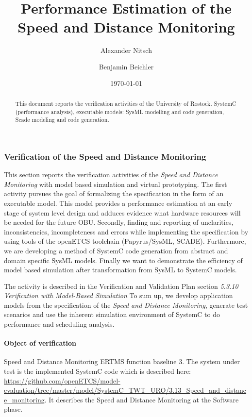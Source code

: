 \documentclass{article}
\title{Performance Estimation of the Speed and Distance Monitoring}
\author{Alexander Nitsch \and Benjamin Beichler}
\date{\today}
\newcommand{\nl}{\mbox{}\\}
\begin{document}
\maketitle
\begin{abstract}
  This document reports the verification activities of the University of Rostock. SystemC (performance analysis), executable models: SysML modelling and code generation, Scade modeling and code generation.
\end{abstract}


\subsubsection{Verification of the  Speed and Distance Monitoring}

This section reports the verification activities of the \emph{Speed and Distance Monitoring} with model based simulation and virtual prototyping. The first activity pursues the goal of formalizing the specification in the form of an executable model. This model provides a performance estimation at an early stage of system level design and adduces evidence what hardware resources will be needed for the future OBU. Secondly, finding and reporting of unclarities, inconsistencies, incompleteness and errors while implementing the specification by using tools of the openETCS toolchain (Papyrus/SysML, SCADE). Furthermore, we are developing a method of SystemC code generation from abstract and domain specific SysML models. Finally we want to demonstrate the efficiency of model based simulation after transformation from SysML to SystemC models.

The activity is described in the Verification and Validation Plan
section {\em 5.3.10 Verification with Model-Based Simulation} \cite{???}
To sum up, we develop application models from the specification of the \emph{Speed and Distance Monitoring}, generate test scenarios and use the inherent simulation environment of SystemC to do performance and scheduling analysis.

\paragraph{Object of verification}  Speed and Distance Monitoring ERTMS function baseline 3.
The system under test is the implemented SystemC code which is described here: \url{https://github.com/openETCS/model-evaluation/tree/master/model/SystemC_TWT_URO/3.13_Speed_and_distance_monitoring}. It describes the Speed and Distance Monitoring at the Software phase.
\nl
\end{document}
